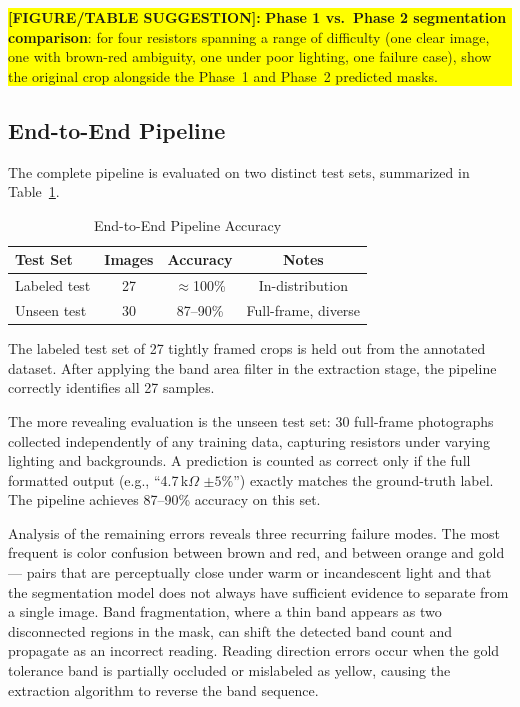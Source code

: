 \documentclass[conference]{IEEEtran}
\newcommand{\figbox}[1]{%
  \vspace{4pt}%
  \noindent
  \colorbox{yellow}{%
    \parbox{\dimexpr\columnwidth-2\fboxsep\relax}{%
      \small\textbf{[FIGURE/TABLE SUGGESTION]:} #1%
    }%
  }%
  \vspace{4pt}%
}
\begin{document}
\figbox{%
  \textbf{Phase 1 vs.\ Phase 2 segmentation comparison}:
  for four resistors spanning a range of difficulty (one
  clear image, one with brown-red ambiguity, one under
  poor lighting, one failure case), show the original crop
  alongside the Phase~1 and Phase~2 predicted masks.
}
 
\subsection{End-to-End Pipeline}
\label{sec:results_e2e}
 
The complete pipeline is evaluated on two distinct test sets,
summarized in Table~\ref{tab:e2e}.
 
\begin{table}[!t]
  \caption{End-to-End Pipeline Accuracy}
  \label{tab:e2e}
  \centering
  \renewcommand{\arraystretch}{1.15}
  \begin{tabular}{@{}lccc@{}}
    \toprule
    \textbf{Test Set} & \textbf{Images}
        & \textbf{Accuracy} & \textbf{Notes} \\
    \midrule
    Labeled test   & 27 & $\approx$100\% & In-distribution \\
    Unseen test    & 30 & 87--90\%       & Full-frame, diverse \\
    \bottomrule
  \end{tabular}
\end{table}
 
The labeled test set of 27 tightly framed crops is held out
from the annotated dataset.
After applying the band area filter in the extraction stage,
the pipeline correctly identifies all 27 samples.
 
The more revealing evaluation is the unseen test set: 30
full-frame photographs collected independently of any training
data, capturing resistors under varying lighting and
backgrounds.
A prediction is counted as correct only if the full formatted
output (e.g., ``4.7\,k$\Omega$ $\pm 5\%$'') exactly matches
the ground-truth label.
The pipeline achieves 87--90\% accuracy on this set.
 
Analysis of the remaining errors reveals three recurring
failure modes.
The most frequent is color confusion between brown and red,
and between orange and gold — pairs that are perceptually
close under warm or incandescent light and that the
segmentation model does not always have sufficient evidence
to separate from a single image.
Band fragmentation, where a thin band appears as two
disconnected regions in the mask, can shift the detected
band count and propagate as an incorrect reading.
Reading direction errors occur when the gold tolerance band
is partially occluded or mislabeled as yellow, causing the
extraction algorithm to reverse the band sequence.
 
\end{document}
